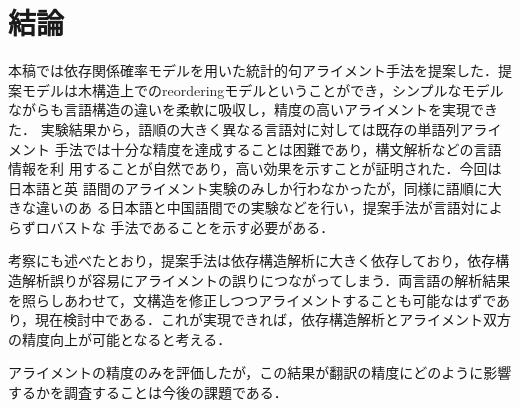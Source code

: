 \documentclass[japanese]{jnlp_1.4}
\begin{document}
\section{結論}

本稿では依存関係確率モデルを用いた統計的句アライメント手法を提案した．提
案モデルは木構造上でのreorderingモデルということができ，シンプルなモデル
ながらも言語構造の違いを柔軟に吸収し，精度の高いアライメントを実現できた．
実験結果から，語順の大きく異なる言語対に対しては既存の単語列アライメント
手法では十分な精度を達成することは困難であり，構文解析などの言語情報を利
用することが自然であり，高い効果を示すことが証明された．今回は日本語と英
語間のアライメント実験のみしか行わなかったが，同様に語順に大きな違いのあ
る日本語と中国語間での実験などを行い，提案手法が言語対によらずロバストな
手法であることを示す必要がある．


考察にも述べたとおり，提案手法は依存構造解析に大きく依存しており，依存構
造解析誤りが容易にアライメントの誤りにつながってしまう．両言語の解析結果
を照らしあわせて，文構造を修正しつつアライメントすることも可能なはずであ
り，現在検討中である．これが実現できれば，依存構造解析とアライメント双方
の精度向上が可能となると考える．

アライメントの精度のみを評価したが，この結果が翻訳の精度にどのように影響
するかを調査することは今後の課題である．
\end{document}
